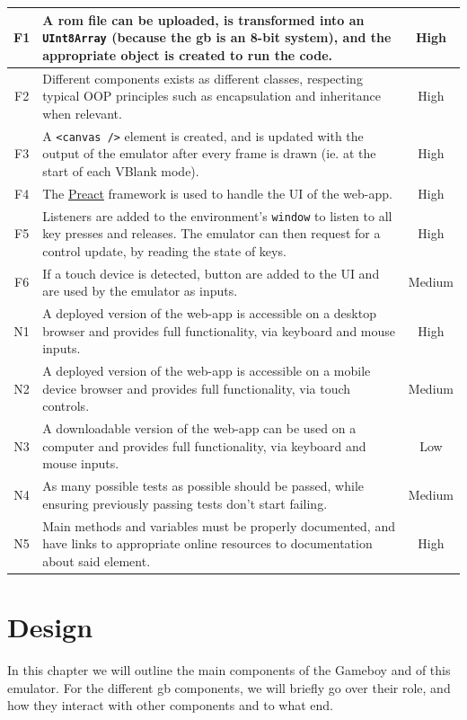 \documentclass[11pt]{report}
\begin{document}
\begin{xltabular}{\textwidth}{|c|X|c|}
    F1 & A \gls{rom} file can be uploaded, is transformed into an \texttt{UInt8Array} (because the \gls{gb} is an 8-bit system), and the appropriate object is created to run the code. & High \\ \hline
    F2 & Different components exists as different classes, respecting typical OOP principles such as encapsulation and inheritance when relevant. & High \\ \hline
    F3 & A \texttt{<canvas />} element is created, and is updated with the output of the emulator after every frame is drawn (ie. at the start of each VBlank mode). & High \\ \hline
    F4 & The \href{https://preactjs.com/}{Preact} framework is used to handle the UI of the web-app. & High \\ \hline
    F5 & Listeners are added to the environment's \texttt{window} to listen to all key presses and releases. The emulator can then request for a control update, by reading the state of keys. & High \\ \hline
    F6 & If a touch device is detected, button are added to the UI and are used by the emulator as inputs. & Medium \\ \hline

    N1 & A deployed version of the web-app is accessible on a desktop browser and provides full functionality, via keyboard and mouse inputs. & High \\ \hline
    N2 & A deployed version of the web-app is accessible on a mobile device browser and provides full functionality, via touch controls. & Medium \\ \hline
    N3 & A downloadable version of the web-app can be used on a computer and provides full functionality, via keyboard and mouse inputs. & Low \\ \hline
    N4 & As many possible tests as possible should be passed, while ensuring previously passing tests don't start failing. & Medium \\ \hline
    N5 & Main methods and variables must be properly documented, and have links to appropriate online resources to documentation about said element. & High \\ \hline
\end{xltabular}

\chapter{Design}

In this chapter we will outline the main components of the Gameboy and of this emulator. For the different \gls{gb} components, we will briefly go over their role, and how they interact with other components and to what end.
\end{document}
